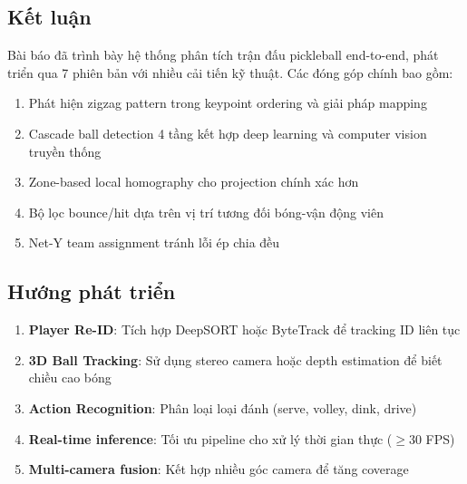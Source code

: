 \documentclass[12pt,a4paper]{article}
\begin{document}
\subsection{Kết luận}
Bài báo đã trình bày hệ thống phân tích trận đấu pickleball end-to-end, phát triển qua 7 phiên bản với nhiều cải tiến kỹ thuật. Các đóng góp chính bao gồm:
\begin{enumerate}[noitemsep]
    \item Phát hiện zigzag pattern trong keypoint ordering và giải pháp mapping
    \item Cascade ball detection 4 tầng kết hợp deep learning và computer vision truyền thống
    \item Zone-based local homography cho projection chính xác hơn
    \item Bộ lọc bounce/hit dựa trên vị trí tương đối bóng-vận động viên
    \item Net-Y team assignment tránh lỗi ép chia đều
\end{enumerate}

\subsection{Hướng phát triển}
\begin{enumerate}[noitemsep]
    \item \textbf{Player Re-ID}: Tích hợp DeepSORT hoặc ByteTrack để tracking ID liên tục
    \item \textbf{3D Ball Tracking}: Sử dụng stereo camera hoặc depth estimation để biết chiều cao bóng
    \item \textbf{Action Recognition}: Phân loại loại đánh (serve, volley, dink, drive)
    \item \textbf{Real-time inference}: Tối ưu pipeline cho xử lý thời gian thực ($\geq 30$ FPS)
    \item \textbf{Multi-camera fusion}: Kết hợp nhiều góc camera để tăng coverage
\end{enumerate}
\end{document}
